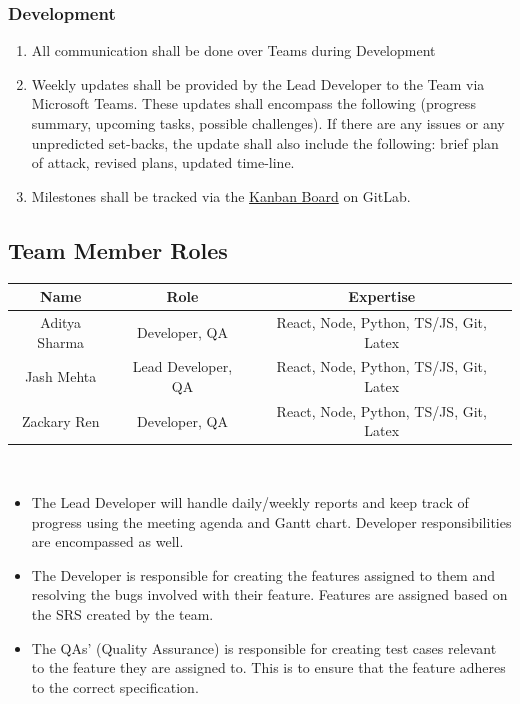 \documentclass[11pt, oneside]{article}   	%
\begin{document}
\subsubsection*{Development}
\begin{enumerate}
\item All communication shall be done over Teams during Development
\item Weekly updates shall be provided by the Lead Developer to the Team via Microsoft Teams. These updates shall encompass the following (progress summary, upcoming tasks, possible challenges). If there are any issues or any unpredicted set-backs, the update shall also include the following: brief plan of attack, revised plans, updated time-line.
\item Milestones shall be tracked via the \href{https://gitlab.cas.mcmaster.ca/renx11/3xa3-project-l02-group9/-/boards}{Kanban Board} on GitLab.
\end{enumerate}


\newpage
\subsection*{Team Member Roles}
\begin{tabular}{ | c | c | c |}
\hline
Name & Role & Expertise \\
\hline
Aditya Sharma & Developer, QA & React, Node, Python, TS/JS, Git, Latex\\
\hline
Jash Mehta & Lead Developer, QA & React, Node, Python, TS/JS, Git, Latex\\
\hline
Zackary Ren & Developer, QA & React, Node, Python, TS/JS, Git, Latex\\
\hline
\end{tabular}
\\
\begin{itemize}
\item The Lead Developer will handle daily/weekly reports and keep track of progress using the meeting agenda and Gantt chart. Developer responsibilities are encompassed as well.\\

\item The Developer is responsible for creating the features assigned to them and resolving the bugs involved with their feature. Features are assigned based on the SRS created by the team.\\

\item The QAs' (Quality Assurance) is responsible for creating test cases relevant to the feature they are assigned to. This is to ensure that the feature adheres to the correct specification.\\
\end{itemize}
\end{document}
